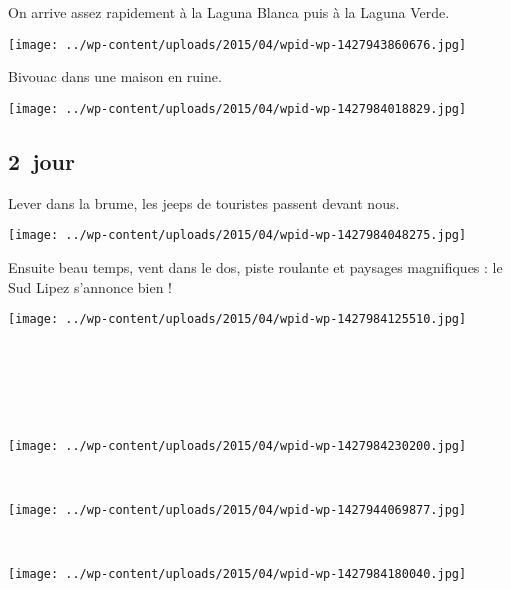  On arrive assez rapidement à la Laguna Blanca puis à la Laguna Verde.
\begin{center} \texttt{[image: ../wp-content/uploads/2015/04/wpid-wp-1427943860676.jpg]} \end{center}
\vspace{-\topsep}

\pagebreak
 Bivouac dans une maison en ruine.\\
\begin{center} \texttt{[image: ../wp-content/uploads/2015/04/wpid-wp-1427984018829.jpg]} \end{center}

\subsection*{2\ieme\ jour} 
 Lever dans la brume, les jeeps de touristes passent devant nous.
\begin{center} \texttt{[image: ../wp-content/uploads/2015/04/wpid-wp-1427984048275.jpg]} \end{center}
\vspace{-\topsep}

\pagebreak
 Ensuite beau temps, vent dans le dos, piste roulante et paysages magnifiques : le Sud Lipez s'annonce bien !
\begin{center} \texttt{[image: ../wp-content/uploads/2015/04/wpid-wp-1427984125510.jpg]} \end{center}
\subsection*{~}

~
\vspace{1mm}
\begin{center} \texttt{[image: ../wp-content/uploads/2015/04/wpid-wp-1427984230200.jpg]} \end{center}
\vspace{-\topsep}

\pagebreak
~
\begin{center} \texttt{[image: ../wp-content/uploads/2015/04/wpid-wp-1427944069877.jpg]} \end{center}
~\\
\begin{center} \texttt{[image: ../wp-content/uploads/2015/04/wpid-wp-1427984180040.jpg]} \end{center}
\vspace{-\topsep}

